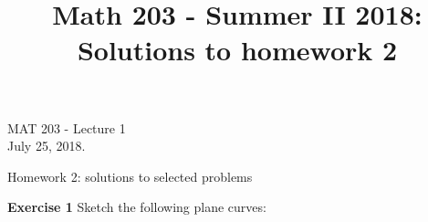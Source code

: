 \documentclass[12pt,oneside]{exam}
\title{Math 203 - Summer II 2018: Solutions to homework 2}
\newenvironment{exercise}[1]{\vspace{.1in}\noindent\textbf{Exercise #1 \hspace{.05em}}}{}
\begin{document}
\begin{flushright}
\sc MAT 203 - Lecture 1\\
July 25, 2018.
\end{flushright}
\bigskip

\begin{center}
\textsf{Homework 2: solutions to selected problems} 
\end{center}

\begin{exercise}{1}
Sketch the following plane curves:

\end{exercise}
\end{document}
